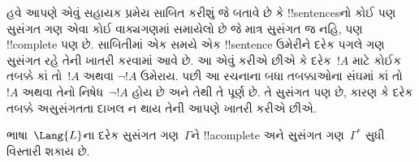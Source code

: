\documentclass[../../../include/open-logic-section]{subfiles}
\begin{document}
      {}
      {}


\begin{explain}
હવે આપણે એવું સહાયક પ્રમેય સાબિત કરીશું જે બતાવે છે કે
!!{sentence}sનો કોઈ પણ સુસંગત ગણ એવા કોઈ વાક્યગણમાં સમાયેલો છે જે
માત્ર સુસંગત જ નહિ, પણ !!{complete} પણ છે. સાબિતીમાં એક સમયે એક
!!{sentence} ઉમેરીને દરેક પગલે ગણ સુસંગત રહે તેની ખાતરી કરવામાં આવે
છે. આ એવું કરીએ છીએ કે દરેક~$!A$ માટે કોઈક તબક્કે કાં તો~$!A$ અથવા
$\lnot !A$ ઉમેરાય. પછી આ રચનાના બધા તબક્કાઓના સંઘમાં કાં તો~$!A$ અથવા
તેનો નિષેધ~$\lnot !A$ હોય છે અને તેથી તે પૂર્ણ છે. તે સુસંગત પણ છે,
કારણ કે દરેક તબક્કે અસુસંગતતા દાખલ ન થાય તેની આપણે ખાતરી કરીએ છીએ.
\end{explain}

\begin{lem}
 ભાષા~$\Lang{L}$ના દરેક સુસંગત ગણ~$\Gamma$ને
!!a{complete} અને સુસંગત ગણ~$\Gamma^*$ સુધી વિસ્તારી શકાય છે.
\end{lem}
\end{document}
